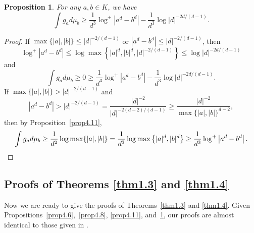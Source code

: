\documentclass[10pt,a4paper]{amsart}
\numberwithin{equation}{section}
\theoremstyle{plain}
\newtheorem{prop}[thm]{Proposition}
\theoremstyle{definition}
\theoremstyle{remark}
\begin{document}
\begin{prop}\label{prop4.12}
For any $a,b\in K$, we have
\[
\int g_{a}d\mu_{b}\geq\frac{1}{d^{3}}\log^{+}\left|a^{d}-b^{d}\right|-\frac{1}{d^{3}}\log|d|^{-2d/(d-1)}.
\]
\end{prop}

\begin{proof}
If $\max\{|a|,|b|\}\leq|d|^{-2/(d-1)}$ or $|a^{d}-b^{d}|\leq|d|^{-2/(d-1)}$,
then
\[
\log^{+}\left|a^{d}-b^{d}\right|\leq\log\max\left\{|a|^{d},|b|^{d},|d|^{-2/(d-1)}\right\}\leq\log|d|^{-2d/(d-1)}
\]
and
\[
\int g_{a}d\mu_{b}\geq0\geq\frac{1}{d^{3}}\log^{+}\left|a^{d}-b^{d}\right|-\frac{1}{d^{3}}\log|d|^{-2d/(d-1)}.
\]
If $\max\{|a|,|b|\}>|d|^{-2/(d-1)}$ and
\[
\left|a^{d}-b^{d}\right|>|d|^{-2/(d-1)}=\frac{|d|^{-2}}{|d|^{-2(d-2)/(d-1)}}\geq\frac{|d|^{-2}}{\max\{|a|,|b|\}^{d-2}},
\]
then by Proposition~\ref{prop4.11},
\[
\int g_{a}d\mu_{b}\geq\frac{1}{d^{2}}\log\max\{|a|,|b|\}=\frac{1}{d^{3}}\log\max\left\{|a|^{d},|b|^{d}\right\}\geq\frac{1}{d^{3}}\log^{+}\left|a^{d}-b^{d}\right|.\qedhere
\]
\end{proof}

\subsection{Proofs of Theorems \texorpdfstring{\ref{thm1.3}}{1.3}
and \texorpdfstring{\ref{thm1.4}}{1.4}}\label{sec4.5}

Now we are ready to give the proofs of Theorems~\ref{thm1.3} and
\ref{thm1.4}. Given Propositions~\ref{prop4.6},~\ref{prop4.8},
\ref{prop4.11}, and~\ref{prop4.12}, our proofs are almost identical
to those given in \cite[Sections 7 and 8]{DKY2}.
\end{document}
